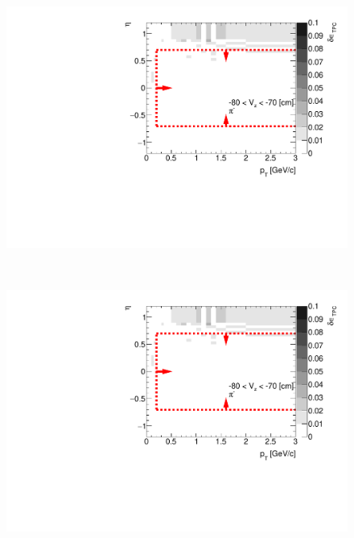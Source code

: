 \begin{figure}[H]\ContinuedFloat
	\parbox{0.325\textwidth}{
		\centering
		\includegraphics[width=\linewidth,page=61]{graphics/systematicsEfficiency/deadMaterial/secondaries_Unbinned_SDCD_.pdf}\\
	}~
	\parbox{0.325\textwidth}{
		\centering
		\includegraphics[width=\linewidth,page=62]{graphics/systematicsEfficiency/deadMaterial/secondaries_Unbinned_SDCD_.pdf}\\
	}
	\parbox{0.325\textwidth}{
		\centering
}
\end{figure}
